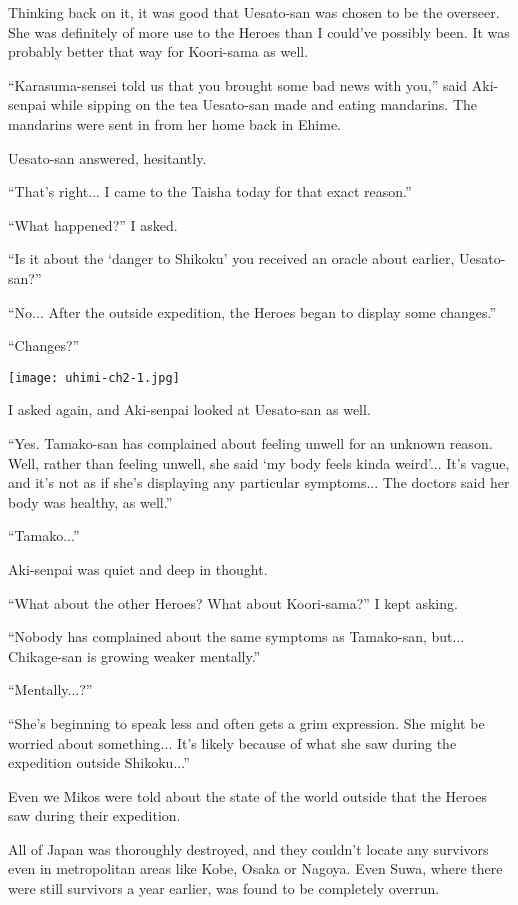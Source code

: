 Thinking back on it, it was good that Uesato-san was chosen to be the overseer. She was definitely of more use to the Heroes than I could've possibly been. It was probably better that way for Koori-sama as well.

``Karasuma-sensei told us that you brought some bad news with you,'' said Aki-senpai while sipping on the tea Uesato-san made and eating mandarins. The mandarins were sent in from her home back in Ehime.

Uesato-san answered, hesitantly.

``That's right... I came to the Taisha today for that exact reason.''

``What happened?'' I asked.

``Is it about the `danger to Shikoku' you received an oracle about earlier, Uesato-san?''

``No... After the outside expedition, the Heroes began to display some changes.''

``Changes?''

\texttt{[image: uhimi-ch2-1.jpg]}
\newpage

I asked again, and Aki-senpai looked at Uesato-san as well.

``Yes. Tamako-san has complained about feeling unwell for an unknown reason. Well, rather than feeling unwell, she said `my body feels kinda weird'... It's vague, and it's not as if she's displaying any particular symptoms... The doctors said her body was healthy, as well.''

``Tamako...''

Aki-senpai was quiet and deep in thought.

``What about the other Heroes? What about Koori-sama?'' I kept asking.

``Nobody has complained about the same symptoms as Tamako-san, but... Chikage-san is growing weaker mentally.''

``Mentally...?''

``She's beginning to speak less and often gets a grim expression. She might be worried about something... It's likely because of what she saw during the expedition outside Shikoku...''

Even we Mikos were told about the state of the world outside that the Heroes saw during their expedition.

All of Japan was thoroughly destroyed, and they couldn't locate any survivors even in metropolitan areas like Kobe, Osaka or Nagoya. Even Suwa, where there were still survivors a year earlier, was found to be completely overrun.

